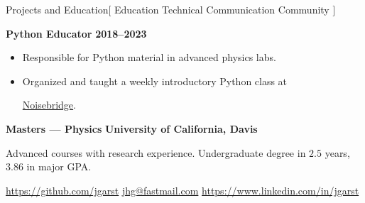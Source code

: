 \documentclass[11pt,a4paper]{article}
\newenvironment{worksection}[3]{
    \begin{addmargin}[0.5em]{0em}
    {\large\bfseries #1} \hfill {\bfseries #2}\\%
    \hspace*{1em}#3
    \begin{itemize}
        [label=-, topsep=0pt, itemsep=0.5ex, parsep=0pt, leftmargin=1em]
}{
    \end{itemize}
    \end{addmargin}
    \medskip
}
\newcommand{\Noisebridge}{
  \href{https://www.noisebridge.net/}{Noisebridge}.
}
\begin{document}
\begin{mysection}{Projects and Education}[
    Education \textbullet{} Technical Communication \textbullet{} Community
]


  \begin{addmargin}[0.5em]{0em}
    {\large\bfseries Python Educator} \hfill {\bfseries 2018--2023}%
    \begin{adjustwidth}{1ex}{0ex}
    \begin{itemize}
        [label=-, topsep=0pt, itemsep=0.5ex, parsep=0pt, leftmargin=1em]

      \item Responsible for Python material in advanced physics labs.
      \item Organized and taught a weekly introductory Python class at
            \Noisebridge

    \end{itemize}
    \end{adjustwidth}
  \end{addmargin}
  \medskip


  \begin{addmargin}[0.5em]{0em}
    {\large\bfseries Masters --- Physics}
    \hfill {\bfseries University of California, Davis}
    \begin{adjustwidth}{1ex}{0ex}
     Advanced courses with research experience.  Undergraduate degree in $2.5$ years, $3.86$ in major GPA.

    \end{adjustwidth}
  \end{addmargin}

\end{mysection}

\vfill

\begin{center}
  \href{https://github.com/jgarst}{https://github.com/jgarst}
  \textbullet{}
  \href{mailto:jhg@fastmail.com}{jhg@fastmail.com}
  \textbullet{}
  \href{https://www.linkedin.com/in/jgarst}
       {https://www.linkedin.com/in/jgarst}
\end{center}
\end{document}
